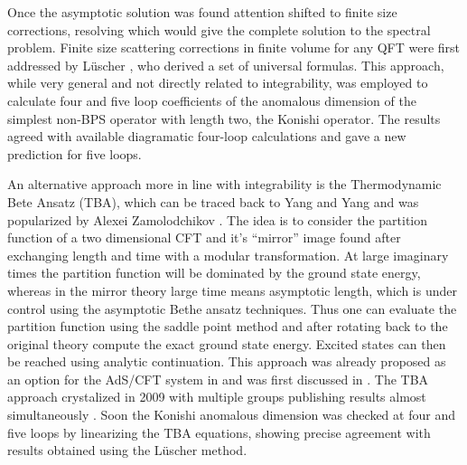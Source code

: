 Once the asymptotic solution was found attention shifted to finite size corrections, resolving which would give the complete solution to the spectral problem. 
Finite size scattering corrections in finite volume for any QFT were first addressed by L\"{u}scher \cite{Luscher:1986}, who derived a set of universal formulas. 
This approach, while very general and not directly related to integrability, was employed to calculate four \cite{Bajnok:2008bm} and five loop coefficients \cite{Bajnok:2009vm} of the anomalous dimension of the simplest non-BPS operator with length two, the Konishi operator.
The results agreed with available diagramatic four-loop calculations \cite{Fiamberti:2007rj} and gave a new prediction for five loops.

An alternative approach more in line with integrability is the Thermodynamic Bete Ansatz (TBA), which can be traced back to Yang and Yang \cite{Yang} and was popularized by Alexei Zamolodchikov \cite{Zamolodchikov1, Zamolodchikov2}. 
The idea is to consider the partition function of a two dimensional CFT and it's ``mirror'' image found after exchanging length and time with a modular transformation.
At large imaginary times the partition function will be dominated by the ground state energy, whereas in the mirror theory large time means asymptotic length, which is under control using the asymptotic Bethe ansatz techniques.
Thus one can evaluate the partition function using the saddle point method and after rotating back to the original theory compute the exact ground state energy. 
Excited states can then be reached using analytic continuation. 
This approach was already proposed as an option for the AdS/CFT system in \cite{Ambjorn:2005wa} and was first discussed in \cite{Arutyunov:2007tc}.
The TBA approach crystalized in 2009 with multiple groups publishing results almost simultaneously \cite{Gromov:2009tv, Bombardelli:2009ns, Gromov:2009bc, Arutyunov:2009ur, Cavaglia:2010nm}.
Soon the Konishi anomalous dimension was checked at four \cite{Gromov:2009bc} and five \cite{Arutyunov:2010gb, Balog:2010xa} loops by linearizing the TBA equations, showing precise agreement with results obtained using the L\"{u}scher method.


